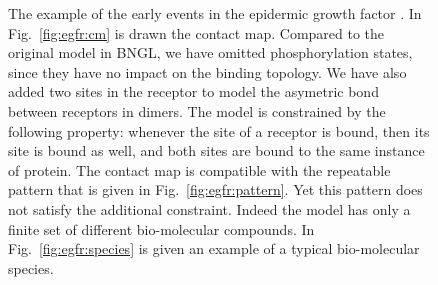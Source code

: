 \documentclass{entcs}
\begin{document}
\begin{figure}[t]
  \begin{minipage}{0.4\linewidth}%
\end{minipage}
\caption{The example of the early events in the epidermic growth factor \cite{Blinov-2006-ANM}. In Fig.~\ref{fig:egfr:cm} is drawn the contact map. Compared to the original model in BNGL, we have omitted phosphorylation states, since they have no impact on the binding topology. We have also
added two sites in the receptor to model the asymetric bond between receptors  in dimers.
The model is constrained by the following property: whenever the site  of a receptor  is bound, then its site  is bound as well, and both sites are bound to the same instance
of protein. The contact map is compatible with the repeatable pattern that is given in Fig.~\ref{fig:egfr:pattern}. Yet this pattern does not satisfy the additional constraint. Indeed the model has only a finite set of different bio-molecular compounds. In Fig.~\ref{fig:egfr:species} is given an example of a typical bio-molecular species.}
\label{fig:egfr}
 \end{figure}
\end{document}
